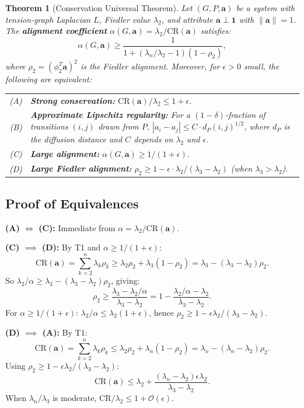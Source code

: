 \documentclass[12pt,letterpaper]{article}
\newtheorem{theorem}{Theorem}[section]
\newcommand{\One}{\mathbf{1}}
\newcommand{\bfa}{\mathbf{a}}
\newcommand{\CR}{\mathrm{CR}}
\newcommand{\cO}{\mathcal{O}}
\begin{document}
\begin{theorem}[Conservation Universal Theorem]
\label{thm:universal}
Let $(G, P, \bfa)$ be a system with tension-graph Laplacian $L$, Fiedler value $\lambda_2$, and attribute $\bfa \perp \One$ with $\|\bfa\| = 1$. The \textbf{alignment coefficient} $\alpha(G, \bfa) = \lambda_2/\CR(\bfa)$ satisfies:
\begin{equation}
\label{eq:fundamental}
  \alpha(G, \bfa) \geq \frac{1}{1 + (\lambda_n/\lambda_2 - 1)(1 - \rho_2)},
\end{equation}
where $\rho_2 = (\phi_2^T \bfa)^2$ is the Fiedler alignment. Moreover, for $\epsilon > 0$ small, the following are equivalent:

\medskip
\begin{tabular}{rp{}}
(A) & \textbf{Strong conservation:} $\CR(\bfa)/\lambda_2 \leq 1 + \epsilon$. \\
(B) & \textbf{Approximate Lipschitz regularity:} For a $(1-\delta)$-fraction of transitions $(i,j)$ drawn from $P$, $|a_i - a_j| \leq C \cdot d_P(i,j)^{1/2}$, where $d_P$ is the diffusion distance and $C$ depends on $\lambda_2$ and $\epsilon$. \\
(C) & \textbf{Large alignment:} $\alpha(G, \bfa) \geq 1/(1+\epsilon)$. \\
(D) & \textbf{Large Fiedler alignment:} $\rho_2 \geq 1 - \epsilon \cdot \lambda_2/(\lambda_3 - \lambda_2)$ (when $\lambda_3 > \lambda_2$).
\end{tabular}
\end{theorem}

\subsection{Proof of Equivalences}

\textbf{(A) $\iff$ (C):} Immediate from $\alpha = \lambda_2/\CR(\bfa)$.

\textbf{(C) $\implies$ (D):} By T1 and $\alpha \geq 1/(1+\epsilon)$:
\[
  \CR(\bfa) = \sum_{k=2}^{n} \lambda_k \rho_k \geq \lambda_2 \rho_2 + \lambda_3(1 - \rho_2) = \lambda_3 - (\lambda_3 - \lambda_2)\rho_2.
\]
So $\lambda_2/\alpha \geq \lambda_3 - (\lambda_3 - \lambda_2)\rho_2$, giving:
\[
  \rho_2 \geq \frac{\lambda_3 - \lambda_2/\alpha}{\lambda_3 - \lambda_2} = 1 - \frac{\lambda_2/\alpha - \lambda_2}{\lambda_3 - \lambda_2}.
\]
For $\alpha \geq 1/(1+\epsilon)$: $\lambda_2/\alpha \leq \lambda_2(1+\epsilon)$, hence $\rho_2 \geq 1 - \epsilon\lambda_2/(\lambda_3 - \lambda_2)$.

\textbf{(D) $\implies$ (A):} By T1:
\[
  \CR(\bfa) = \sum_{k=2}^{n} \lambda_k \rho_k \leq \lambda_2 \rho_2 + \lambda_n(1 - \rho_2) = \lambda_n - (\lambda_n - \lambda_2)\rho_2.
\]
Using $\rho_2 \geq 1 - \epsilon\lambda_2/(\lambda_3 - \lambda_2)$:
\[
  \CR(\bfa) \leq \lambda_2 + \frac{(\lambda_n - \lambda_2)\epsilon\lambda_2}{\lambda_3 - \lambda_2}.
\]
When $\lambda_n/\lambda_3$ is moderate, $\CR/\lambda_2 \leq 1 + \cO(\epsilon)$.
\end{document}

